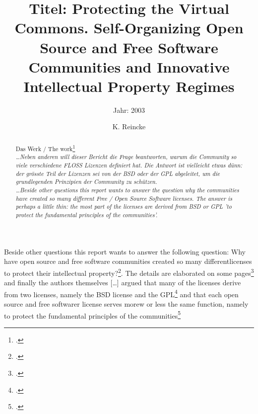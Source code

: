 \documentclass[DIV=calc,BCOR=5mm,11pt,headings=small,oneside,abstract=true, toc=bib]{scrartcl}
\begin{document}

\titlehead{Literaturexzerpt}
\subject{Autor(en): R. van Wendel de Joode and J. A. de Bruijn and M. J. G. van
Eeten}
\title{Titel: Protecting the Virtual Commons. Self-Organizing Open Source
and Free Software Communities and Innovative Intellectual Property Regimes}
\subtitle{Jahr: 2003 }
\author{K. Reincke}

\maketitle

\begin{abstract}
Das Werk / The work\footcite[][]{VwdjDebVEee2003a} \\
\noindent \itshape
\ldots Neben anderen will dieser Bericht die Frage beantworten, warum die
Community so viele verschiedene FLOSS Lizenzen definiert hat. Die Antwort ist
vielleicht etwas dünn: der grösste Teil der Lizenzen sei von der BSD oder der
GPL abgeleitet, um die grundlegenden Prinzipien der Community zu schützen. \\
\noindent
\ldots Beside other questions this report wants to answer the question why the
communities have created so many different Free / Open Source Software licenses.
The answer is perhaps a little thin: the most part of the licenses are derived
from BSD or GPL 'to protect the fundamental principles of the communities'.
\end{abstract}
\footnotesize
\normalsize

Beside other questions this report wants to answer the following question:
\qlqq{}Why have open source and free software communities created so many
differentlicenses to protect their intellectual
property?\grqq{}\footcite[cf.][2]{VwdjDebVEee2003a}. The details are elaborated
on some pages\footcite[cf.][72ff]{VwdjDebVEee2003a} and finally the authors
themselves \glqq{}[\ldots] argued that many of the licenses derive from two
licenses, namely the BSD license and the
GPL\grqq{}\footcite[cf.][109]{VwdjDebVEee2003a} and that \glqq{} each open
source and free softwarer license serves morew or less the same function, namely
to protect the fundamental principles of the
communities\grqq{}\footcite[cf.][11o]{VwdjDebVEee2003a}

\small

\end{document}
